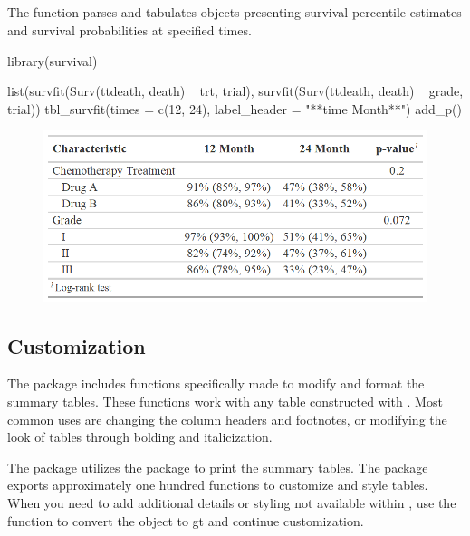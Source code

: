 \subsection{\texorpdfstring{}{tbl\_survfit()}}

The  function parses and tabulates  objects presenting survival percentile estimates and survival probabilities at specified times. 

\begin{example}
library(survival)

list(survfit(Surv(ttdeath, death) ~ trt, trial),
     survfit(Surv(ttdeath, death) ~ grade, trial)) %
  tbl_survfit(times = c(12, 24),
              label_header = "**{time} Month**") %
  add_p()
\end{example}

\begin{figure}[h!]
  \includegraphics[scale=0.49]{survfit.png}
  \centering
\end{figure}

\subsection{Customization}

The  package includes functions specifically made to modify and format the summary tables.
These functions work with any table constructed with .
Most common uses are changing the column headers and footnotes, or modifying the look of tables through bolding and italicization. 

\newpage


The  package utilizes the  package to print the summary tables.
The  package exports approximately one hundred functions to customize and style tables.
When you need to add additional details or styling not available within , use the  function to convert the  object to gt and continue customization.

